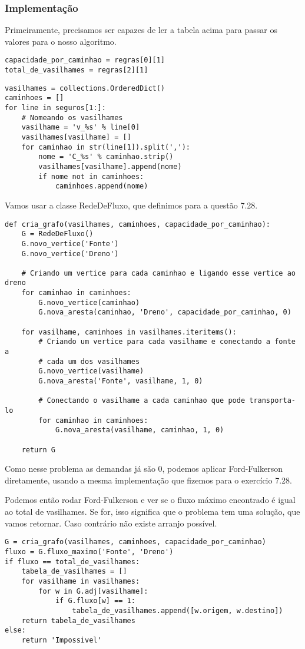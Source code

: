 \documentclass[11pt]{article}
\begin{document}
\subsubsection{Implementação}
\label{sec-2-1-1}

Primeiramente, precisamos ser capazes de ler a tabela acima para
passar os valores para o nosso algoritmo.
\begin{verbatim}
capacidade_por_caminhao = regras[0][1]
total_de_vasilhames = regras[2][1]
\end{verbatim}

\begin{verbatim}
vasilhames = collections.OrderedDict()
caminhoes = []
for line in seguros[1:]:
    # Nomeando os vasilhames
    vasilhame = 'v_%s' % line[0]
    vasilhames[vasilhame] = []
    for caminhao in str(line[1]).split(','):
        nome = 'C_%s' % caminhao.strip()
        vasilhames[vasilhame].append(nome)
        if nome not in caminhoes:
            caminhoes.append(nome)
\end{verbatim}

Vamos usar a classe RedeDeFluxo, que definimos para a questão 7.28.

\begin{verbatim}
def cria_grafo(vasilhames, caminhoes, capacidade_por_caminhao):
    G = RedeDeFluxo()
    G.novo_vertice('Fonte')
    G.novo_vertice('Dreno')

    # Criando um vertice para cada caminhao e ligando esse vertice ao dreno
    for caminhao in caminhoes:
        G.novo_vertice(caminhao)
        G.nova_aresta(caminhao, 'Dreno', capacidade_por_caminhao, 0)

    for vasilhame, caminhoes in vasilhames.iteritems():
        # Criando um vertice para cada vasilhame e conectando a fonte a
        # cada um dos vasilhames
        G.novo_vertice(vasilhame)
        G.nova_aresta('Fonte', vasilhame, 1, 0)

        # Conectando o vasilhame a cada caminhao que pode transporta-lo
        for caminhao in caminhoes:
            G.nova_aresta(vasilhame, caminhao, 1, 0)

    return G
\end{verbatim}

Como nesse problema as demandas já são 0, podemos aplicar
Ford-Fulkerson diretamente, usando a mesma implementação que fizemos
para o exercício 7.28.

Podemos então rodar Ford-Fulkerson e ver se o fluxo máximo encontrado
é igual ao total de vasilhames. Se for, isso significa que o problema
tem uma solução, que vamos retornar. Caso contrário não existe arranjo
possível.
\begin{verbatim}
G = cria_grafo(vasilhames, caminhoes, capacidade_por_caminhao)
fluxo = G.fluxo_maximo('Fonte', 'Dreno')
if fluxo == total_de_vasilhames:
    tabela_de_vasilhames = []
    for vasilhame in vasilhames:
        for w in G.adj[vasilhame]:
            if G.fluxo[w] == 1:
                tabela_de_vasilhames.append([w.origem, w.destino])
    return tabela_de_vasilhames
else:
    return 'Impossivel'
\end{verbatim}
\end{document}
